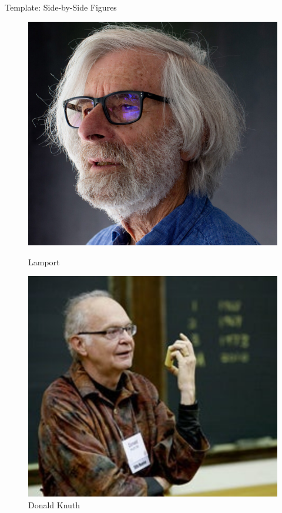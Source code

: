 \begin{frame}{Template: Side-by-Side Figures}
     \begin{figure}
          \centering
          \begin{minipage}{0.45\textwidth}
               \centering
               \includegraphics[width=\textwidth]{figs/Lamport.png}
               \caption{Lamport}
               \label{fig:latex_logo}
          \end{minipage}
          \hfill
          \begin{minipage}{0.45\textwidth}
               \centering
               \includegraphics[width=\textwidth]{figs/knuth}
               \caption{Donald Knuth}
               \label{fig:knuth}
          \end{minipage}
     \end{figure}
     

\end{frame}
